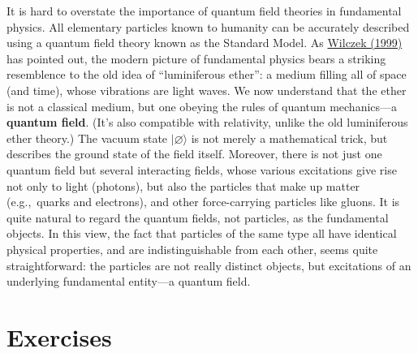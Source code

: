 \documentclass[pra,12pt]{revtex4}
\begin{document}
It is hard to overstate the importance of quantum field theories in
fundamental physics.  All elementary particles known to humanity can
be accurately described using a quantum field theory known as the
Standard Model.  As \hyperref[cite:wilczek]{Wilczek (1999)} has
pointed out, the modern picture of fundamental physics bears a
striking resemblence to the old idea of ``luminiferous ether'': a
medium filling all of space (and time), whose vibrations are light
waves.  We now understand that the ether is not a classical medium,
but one obeying the rules of quantum mechanics---a \textbf{quantum
  field}.  (It's also compatible with relativity, unlike the old
luminiferous ether theory.)  The vacuum state $|\varnothing\rangle$ is
not merely a mathematical trick, but describes the ground state of the
field itself.  Moreover, there is not just one quantum field but
several interacting fields, whose various excitations give rise not
only to light (photons), but also the particles that make up matter
(e.g.,~quarks and electrons), and other force-carrying particles like
gluons.  It is quite natural to regard the quantum fields, not
particles, as the fundamental objects.  In this view, the fact that
particles of the same type all have identical physical properties, and
are indistinguishable from each other, seems quite straightforward:
the particles are not really distinct objects, but excitations of an
underlying fundamental entity---a quantum field.

\section*{Exercises}
\end{document}
